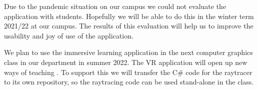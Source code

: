 \documentclass{VRARWorkshop}
\begin{document}
Due to the pandemic situation on our campus we could not evaluate the application with students.
Hopefully we will be able to do this in the winter term 2021/22 at our campus.
The results of this evaluation will help us to improve the usability and joy of use of the application.

We plan to use the immersive learning application in the next computer graphics class in our department
in summer 2022. The VR application will open up new ways of teaching \cite{ganovelli_08, vitsas_20}.
To support this we will transfer the C\# code for the raytracer to its own repository, so the raytracing code
can be used stand-alone in the class.

\VRARsetbibstyle

\end{document}
